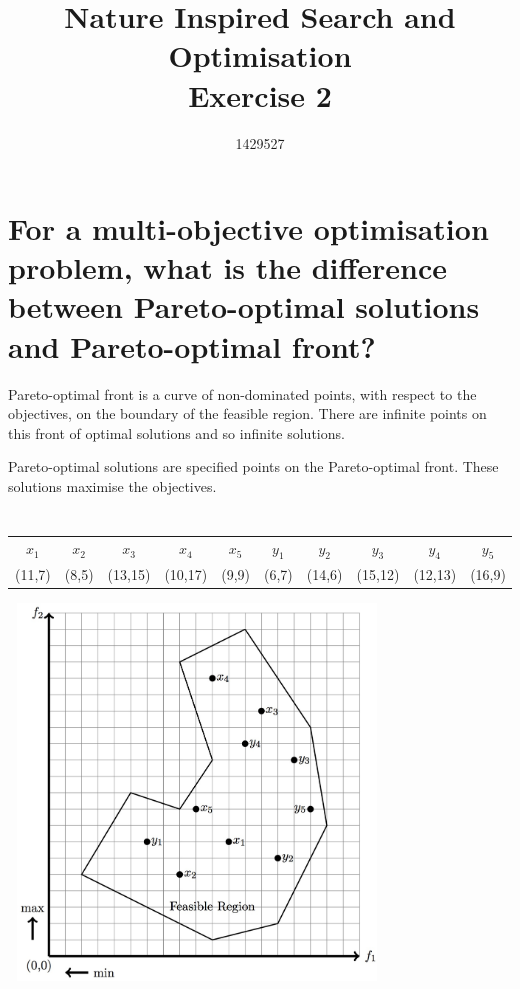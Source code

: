 \documentclass{article}
\begin{document}
\title{%
  Nature Inspired Search and Optimisation  \\
  \large Exercise 2 \\
    }

\author{1429527}

\maketitle

\section{For a multi-objective optimisation problem, what is the difference between Pareto-optimal solutions and Pareto-optimal front?}

Pareto-optimal front is a curve of non-dominated points, with respect to the objectives, on the boundary of the feasible region. There are infinite points on this front of optimal solutions and so infinite solutions. 

Pareto-optimal solutions are specified points on the Pareto-optimal front. These solutions maximise the objectives.

\section{}

\begin{center}
\begin{tabular}{ |c|c|c|c|c|c|c|c|c|c| } 
 \hline
 $x_1$ & $x_2$ & $x_3$ & $x_4$ & $x_5$ & $y_1$ & $y_2$ & $y_3$ & $y_4$ & $y_5$ \\ 
 (11,7) & (8,5) & (13,15) & (10,17) & (9,9) & (6,7) & (14,6) & (15,12) & (12,13) & (16,9) \\
 \hline
\end{tabular}
\end{center}

\includegraphics[width=10cm,height=10cm,keepaspectratio]{fig1.jpg}
\end{document}
